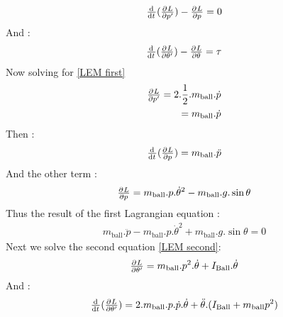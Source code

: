 \documentclass{article}
\begin{document}
\begin{equation}\label{LEM first}
	\begin{split}
		\od{}{t}(\pd{L}{p'}) - \pd{L}{p} = 0
	\end{split}
\end{equation}
And :
\begin{equation}\label{LEM second}
	\begin{split}
		\od{}{t}(\pd{L}{\theta'}) - \pd{L}{\theta} = \tau
	\end{split}	
\end{equation}
Now solving for \ref{LEM first}
\begin{equation}
	\begin{split}
	\pd{L}{p'} = 2 .\dfrac{1}{2}.m_{\text{ball}}.\dot{p} \\
	=m_{\text{ball}}.\dot{p}
	\end{split}	
\end{equation}
Then :
\begin{equation}
	\begin{split}
		\od{}{t}(\pd{L}{p}) = m_{\text{ball}}.\ddot{p}
	\end{split}
\end{equation}
And the other term :
\begin{equation}
	\begin{split}
	\pd{L}{p} = m_{\text{ball}}.p.\dot{\theta}^2 - m_{\text{ball}}.g.\sin{\theta}
	\end{split}
\end{equation}
Thus the result of the first Lagrangian equation :
\begin{equation}
	\begin{split}
		m_{\text{ball}}.\ddot{p} -  m_{\text{ball}}.p.\dot{\theta}^2 + m_{\text{ball}}.g.\sin{\theta} = 0
	\end{split}
\end{equation}
Next we solve the second equation \ref{LEM second}:
\begin{equation}
	\begin{split}
	\pd{L}{\theta'} = m_{\text{ball}}.p^2.\dot{\theta} + I_{\text{Ball}}.\dot{\theta}
	\end{split}
\end{equation}
And : 
\begin{equation}
	\begin{split}
		\od{}{t}(\pd{L}{\theta'}) = 2.m_{\text{ball}}.p.\dot{p}.\dot{\theta} + \ddot{\theta}.(I_{\text{Ball}} + m_{\text{ball}} p^2)
	\end{split}
\end{equation}
\end{document}
